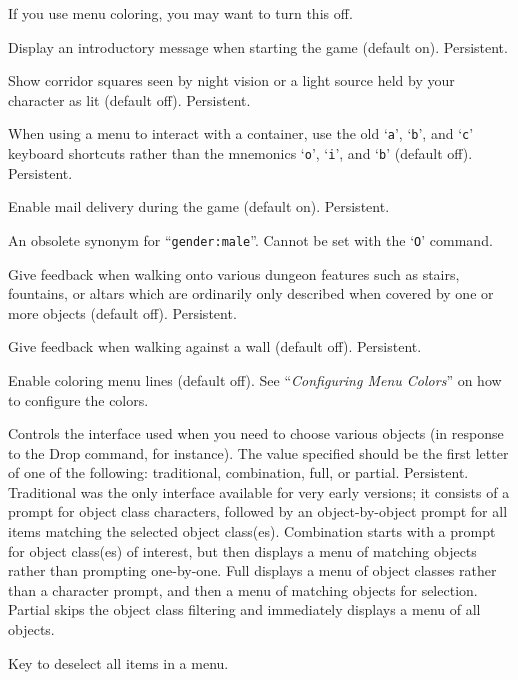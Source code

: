 If you use menu coloring, you may want to turn this off.
\item[\ib{legacy}]
Display an introductory message when starting the game (default on).
Persistent.
\item[\ib{lit\verb+_+corridor}]
Show corridor squares seen by night vision or a light source held by your
character as lit (default off).  Persistent.
\item[\ib{lootabc}]
When using a menu to interact with a container,
use the old `{\tt a}', `{\tt b}', and `{\tt c}' keyboard shortcuts
rather than the mnemonics `{\tt o}', `{\tt i}', and `{\tt b}' (default off).
Persistent.
\item[\ib{mail}]
Enable mail delivery during the game (default on).  Persistent.
\item[\ib{male}]
An obsolete synonym for ``{\tt gender:male}''.  Cannot be set with the
`{\tt O}' command.
\item[\ib{mention\verb+_+decor}]
Give feedback when walking onto various dungeon features such as stairs,
fountains, or altars which are ordinarily only described when covered
by one or more objects (default off).  Persistent.
\item[\ib{mention\verb+_+walls}]
Give feedback when walking against a wall (default off).  Persistent.
\item[\ib{menucolors}]
Enable coloring menu lines (default off).
See ``{\it Configuring Menu Colors\/}'' on how to configure the colors.
\item[\ib{menustyle}]
Controls the interface used when you need to choose various objects (in
response to the Drop command, for instance).
The value specified should be the first letter of one of the following:
traditional, combination, full, or partial.
Persistent.
\\
Traditional was the only interface available for very
early versions; it consists of a prompt for object class characters,
followed by an object-by-object prompt for all items matching the selected
object class(es).
Combination starts with a prompt for object class(es)
of interest, but then displays a menu of matching objects rather than
prompting one-by-one.
Full displays a menu of
object classes rather than a character prompt, and then a menu of matching
objects for selection.
Partial skips the object class filtering and
immediately displays a menu of all objects.
\item[\ib{menu\verb+_+deselect\verb+_+all}]
Key to deselect all items in a menu.

